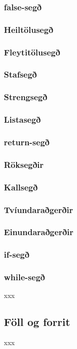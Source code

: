 \documentclass[12pt,a4paper]{article}
\begin{document}
\subsubsection{false-segð}
\subsubsection{Heiltölusegð}
\subsubsection{Fleytitölusegð}
\subsubsection{Stafsegð}
\subsubsection{Strengsegð}
\subsubsection{Listasegð}
\subsubsection{return-segð}
\subsubsection{Röksegðir}
\subsubsection{Kallsegð}
\subsubsection{Tvíundaraðgerðir}
\subsubsection{Einundaraðgerðir}
\subsubsection{if-segð}
\subsubsection{while-segð}
xxx
\subsection{Föll og forrit}
xxx
\end{document}
